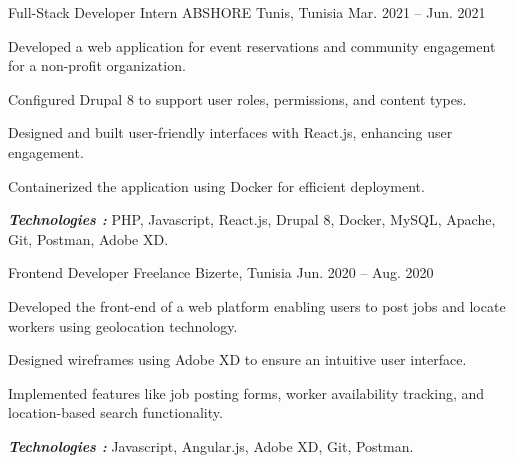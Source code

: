 \begin{cventries}
  \cventry
    {Full-Stack Developer Intern} %
    {ABSHORE} %
    {Tunis, Tunisia} %
    {Mar. 2021 – Jun. 2021} %
    {
      \begin{cvitems} %
        \item {Developed a web application for event reservations and community engagement
        for a non-profit organization.}
        \item {Configured Drupal 8 to support user roles, permissions, and content types.}
        \item {Designed and built user-friendly interfaces with React.js, enhancing user engagement.}
        \item {Containerized the application using Docker for efficient deployment.}
       \end{cvitems}
       \vspace{5mm}
      \textbf{\textit{Technologies :}} PHP, Javascript, React.js, Drupal 8, Docker, MySQL, Apache, Git, Postman, Adobe XD.
      \vspace{5mm}
    }

  \cventry
    {Frontend Developer} %
    {Freelance} %
    {Bizerte, Tunisia} %
    {Jun. 2020 – Aug. 2020} %
    {
      \begin{cvitems} %
        \item {Developed the front-end of a web platform enabling users to post jobs and
        locate workers using geolocation technology.}
        \item {Designed wireframes using Adobe XD to ensure an intuitive user interface.}
        \item {Implemented features like job posting forms, worker availability tracking,
        and location-based search functionality.}
       \end{cvitems}
       \vspace{5mm}
      \textbf{\textit{Technologies :}} Javascript, Angular.js, Adobe XD, Git, Postman.
      \vspace{5mm}
    }


\end{cventries}
